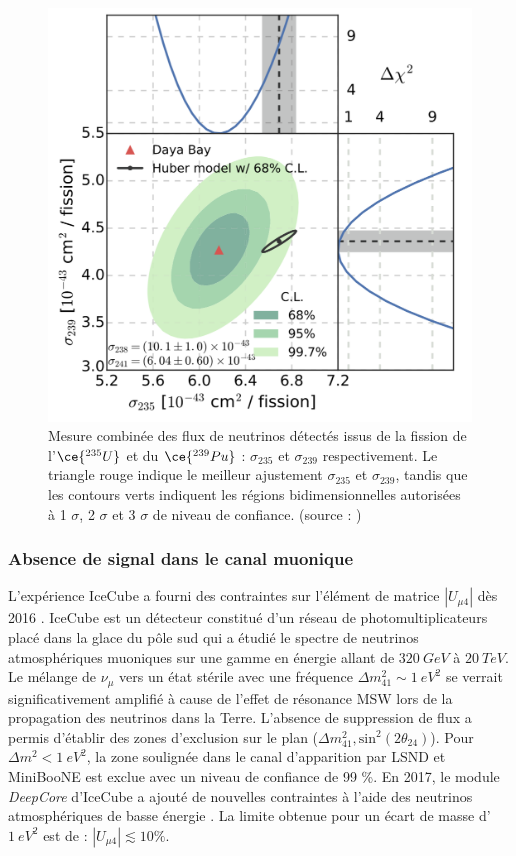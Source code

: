{%
\begin{figure}[h!]
  \centering
  \includegraphics[width=0.7\linewidth]{images/DB_decorr_flux.png}
  \caption[Mesure combinée des flux de neutrinos détectés issus de la fission de l'$\ce{^{235}U}$ et du $\ce{^{239}Pu}$]{Mesure combinée des flux de neutrinos détectés issus de la fission de l'$\ce{^{235}U}$ et du $\ce{^{239}Pu}$ : $\sigma_{235}$ et $\sigma_{239}$ respectivement. Le triangle rouge indique le meilleur ajustement $\sigma_{235}$ et $\sigma_{239}$, tandis que les contours verts indiquent les régions bidimensionnelles autorisées à 1 $\sigma$, 2 $\sigma$ et 3 $\sigma$ de niveau de confiance. (source : \cite{An:2017osx})}
  \label{fig:DB_decorr_flux.png}
\end{figure}


}

\bigbreak

\subsubsection*{Absence de signal dans le canal muonique}

L'expérience IceCube a fourni des contraintes sur l'élément de matrice $\left|U_{\mu 4}\right|$ dès 2016 \cite{TheIceCube:2016oqi}. IceCube est un détecteur constitué d'un réseau de photomultiplicateurs placé dans la glace du pôle sud qui a étudié le spectre de neutrinos atmosphériques muoniques sur une gamme en énergie allant de $\SI{320}{GeV}$ à $\SI{20}{TeV}$. Le mélange de $\nu_\mu$ vers un état stérile avec une fréquence $\Delta m^2_{41} \sim \SI{1}{eV^2}$ se verrait significativement amplifié à cause de l'effet de résonance MSW lors de la propagation des neutrinos dans la Terre. L'absence de suppression de flux a permis d'établir des zones d'exclusion sur le plan ($\Delta m^2_{41}, \textrm{sin}^2(2\theta_{24})$). Pour $\Delta m^2 < \SI{1}{eV^2}$, la zone soulignée dans le canal d'apparition par LSND et MiniBooNE est exclue avec un niveau de confiance de 99 \%. En 2017, le module \textit{DeepCore} d'IceCube a ajouté de nouvelles contraintes à l'aide des neutrinos atmosphériques de basse énergie \cite{Aartsen:2017bap}. La limite obtenue pour un écart de masse d'$\SI{1}{eV^2}$ est de : $\left|U_{\mu 4}\right| \lesssim 10 \%$.\\

